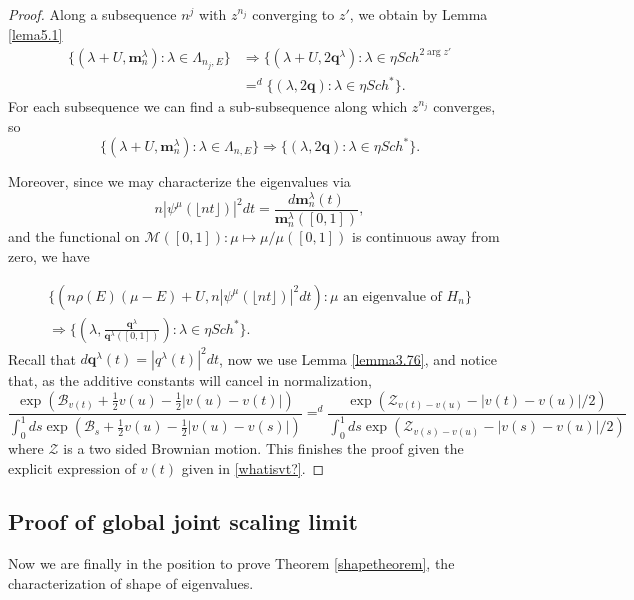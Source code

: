 \documentclass[12pt, reqno]{amsart}
\theoremstyle{definition}
\theoremstyle{remark}
\numberwithin{equation}{section}
\begin{document}
\begin{proof}
    Along a subsequence $n^j$ with $z^{n_j}$ converging to $z'$, we obtain by Lemma \ref{lema5.1}
    $$
\begin{aligned} \{(\lambda+U,\boldsymbol{m}_n^\lambda):\lambda\in \Lambda_{n_j,E}\}&\Rightarrow \{(\lambda+U,2\boldsymbol{q}^\lambda):\lambda\in \eta Sch^{2\arg z'}\\
&=^d \{(\lambda,2\boldsymbol{q}):\lambda\in \eta Sch^*\}.
 \end{aligned} $$ For each subsequence we can find a sub-subsequence along which $z^{n_j}$ converges, so
 $$\{(\lambda+U,\boldsymbol{m}_n^\lambda):\lambda\in \Lambda_{n,E}\}\Rightarrow \{(\lambda,2\boldsymbol{q}):\lambda\in \eta Sch^*\}.$$


Moreover, since we may characterize the eigenvalues via
$$n|\psi^\mu(\lfloor nt\rfloor)|^2dt =\frac{d\boldsymbol{m}_n^\lambda(t)}{\boldsymbol{m}_n^\lambda([0,1])},$$
 and the functional on $\mathcal{M}([0,1]):\mu\mapsto \mu/\mu([0,1])$ is continuous away from zero, we have


$$\begin{aligned} \{(n\rho(E)(\mu-E)+U,n|\psi^\mu(\lfloor nt\rfloor)|^2 dt):\mu \text{ an  eigenvalue of }H_n\}\\
\Rightarrow \{(\lambda,\frac{\boldsymbol{q}^\lambda}{\boldsymbol{q}^\lambda([0,1])}):\lambda\in\eta Sch^{*}\}.
\end{aligned}$$
Recall that $d\boldsymbol{q}^\lambda(t)=|q^\lambda(t)|^2dt$, now we use Lemma \ref{lemma3.76}, and notice that, as the additive constants will cancel in normalization,
$$
\frac{\exp(\mathcal{B}_{v(t)}+\frac{1}{2}v(u)-\frac{1}{2}|v(u)-v(t)|)}{
\int_0^1 ds \exp(\mathcal{B}_s+\frac{1}{2}v(u)-\frac{1}{2}|v(u)-v(s)|)}=^d \frac{\exp(\mathcal{Z}_{v(t)-v(u)}-|v(t)-v(u)|/2)}{\int_0^1 ds\exp(\mathcal{Z}_{v(s)-v(u)}-|v(s)-v(u)|/2)}$$
where $\mathcal{Z}$ is a two sided Brownian motion. This finishes the proof given the explicit expression of $v(t)$ given in \eqref{whatisvt?}.\end{proof}


\subsection{Proof of global joint scaling limit}

Now we are finally in the position to prove Theorem \ref{shapetheorem}, the characterization of shape of eigenvalues.
\end{document}
